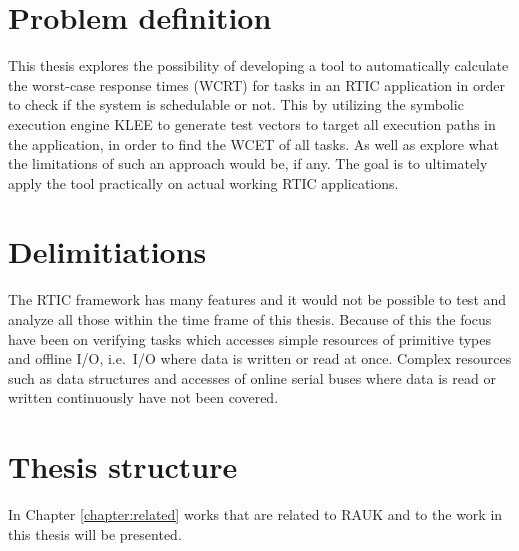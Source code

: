 \section{Problem definition}
This thesis explores the possibility of developing a tool to automatically
calculate the worst-case response times (WCRT) for tasks in an RTIC
application in order to check if the system is schedulable or not. This by
utilizing the symbolic execution engine KLEE to generate test vectors to target
all execution paths in the application, in order to find the WCET of all tasks.
As well as explore what the limitations of such an approach would be, if any.
The goal is to ultimately apply the tool practically on actual working RTIC
applications.

\section{Delimitiations}
The RTIC framework has many features and it would not be possible to test and
analyze all those within the time frame of this thesis. Because of this the
focus have been on verifying tasks which accesses simple resources of primitive
types and offline I/O, i.e.\ I/O where data is written or read at once. Complex
resources such as data structures and accesses of online serial buses where
data is read or written continuously have not been covered.

\section{Thesis structure}
In Chapter \ref{chapter:related} works that are related to RAUK and to the work in
this thesis will be presented.
